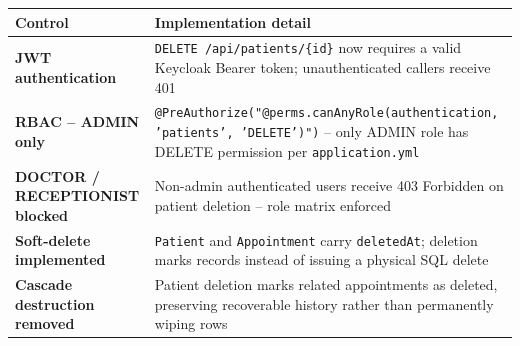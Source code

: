 \documentclass[12pt,a4paper]{report}
\begin{document}
\par\noindent\begin{minipage}{\linewidth}
\centering
\scriptsize
\renewcommand{\arraystretch}{0.88}
\begin{tabularx}{\linewidth}{>{\bfseries}p{4.2cm} X}
\toprule
\textbf{Control} & \textbf{Implementation detail} \\
\midrule
JWT authentication            & \texttt{DELETE /api/patients/\{id\}} now requires a valid Keycloak Bearer token; unauthenticated callers receive 401 \\
RBAC -- ADMIN only            & \texttt{@PreAuthorize("@perms.canAnyRole(authentication, 'patients', 'DELETE')")} -- only ADMIN role has DELETE permission per \texttt{application.yml} \\
DOCTOR / RECEPTIONIST blocked & Non-admin authenticated users receive 403 Forbidden on patient deletion -- role matrix enforced \\
Soft-delete implemented       & \texttt{Patient} and \texttt{Appointment} carry \texttt{deletedAt}; deletion marks records instead of issuing a physical SQL delete \\
Cascade destruction removed   & Patient deletion marks related appointments as deleted, preserving recoverable history rather than permanently wiping rows \\
\bottomrule
\end{tabularx}
\end{minipage}
\par\medskip
\end{document}
